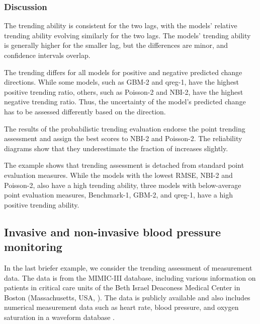 \subsubsection*{Discussion}

The trending ability is consistent for the two lags, with the models' relative trending ability evolving similarly for the two lags.
The models' trending ability is generally higher for the smaller lag, but the differences are minor, and confidence intervals overlap.

The trending differs for all models for positive and negative predicted change directions.
While some models, such as GBM-2 and qreg-1, have the highest positive trending ratio, others, such as Poisson-2 and NBI-2, have the highest negative trending ratio.
Thus, the uncertainty of the model's predicted change has to be assessed differently based on the direction.

The results of the probabilistic trending evaluation endorse the point trending assessment and assign the best scores to NBI-2 and Poisson-2. 
The reliability diagrams show that they underestimate the fraction of increases slightly. 

The example shows that trending assessment is detached from standard point evaluation measures.
While the models with the lowest RMSE, NBI-2 and Poisson-2, also have a high trending ability, three models with below-average point evaluation measures, Benchmark-1, GBM-2, and qreg-1, have a high positive trending ability.


\subsection{Invasive and non-invasive blood pressure monitoring} \label{sec:application_measurement}

In the last briefer example, we consider the trending assessment of measurement data.
The data is from the MIMIC-III database, including various information on patients in critical care units of the Beth Israel Deaconess Medical Center in Boston (Massachusetts, USA, \cite{Johnson2016}).
The data is publicly available and also includes numerical measurement data such as heart rate, blood pressure, and oxygen saturation in a waveform database \parencites[][]{Moody2017}[available through][]{Goldberger2000}.

